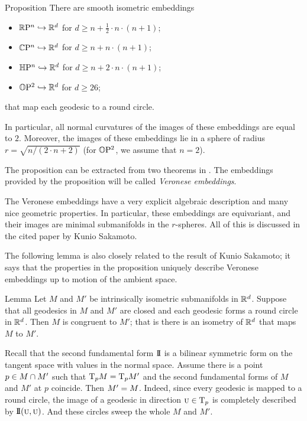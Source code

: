 \documentclass[a4paper,10pt]{article}
\begin{document}
\begin{thm}{Proposition}
There are smooth isometric embeddings
\begin{itemize}
 \item $\mathbb{R}\mathrm{P}^n \hookrightarrow\mathbb{R}^d$ for $d\ge n+\tfrac12\cdot n\cdot(n+1)$;
 \item $\mathbb{C}\mathrm{P}^n \hookrightarrow\mathbb{R}^d$ for $d\ge n+n\cdot(n+1)$;
 \item $\mathbb{H}\mathrm{P}^n \hookrightarrow\mathbb{R}^d$ for $d\ge n+2\cdot n\cdot(n+1)$;
 \item $\mathbb{O}\mathrm{P}^2 \hookrightarrow\mathbb{R}^d$ for $d\ge 26$;
\end{itemize}
that map each geodesic to a round circle.

In particular, all normal curvatures of the images of these embeddings are equal to $2$.
Moreover, the images of these embeddings lie in a sphere of radius $r=\sqrt{n/(2\cdot n+2)}$ (for $\mathbb{O}\mathrm{P}^2$, we assume that $n=2$). 
\end{thm}

The proposition can be extracted from two theorems in \cite[§ 2]{sakamoto}.
The embeddings provided by the proposition will be called \emph{Veronese embeddings}.

The Veronese embeddings have a very explicit algebraic description and many nice geometric properties.
In particular,
these embeddings are equivariant, and 
their images are minimal submanifolds in the $r$-spheres.
All of this is discussed in the cited paper by Kunio Sakamoto.

The following lemma is also closely related to the result of Kunio Sakamoto;
it says that the properties in the proposition uniquely describe
Veronese embeddings up to motion of the ambient space.

\begin{thm}{Lemma}
Let $M$ and $M'$ be intrinsically isometric submanifolds in $\mathbb{R}^d$.
Suppose that all geodesics in $M$ and $M'$ are closed
and each geodesic forms a round circle in $\mathbb{R}^d$.
Then $M$ is congruent to $M'$;
that is there is an isometry of $\mathbb{R}^d$ that maps $M$ to $M'$.
\end{thm}

Recall that the second fundamental form $\mathrm{I}\!\mathrm{I}$ is a bilinear symmetric form on the tangent space with values in the normal space.
Assume there is a point $p\z\in M\cap M'$ such that $\mathrm{T}_pM=\mathrm{T}_pM'$ and the second fundamental forms of $M$ and $M'$ at $p$ coincide.
Then $M'\z=M$.
Indeed, since every geodesic is mapped to a round circle, the image of a geodesic in direction ${{\normalfont\textsc{u}}}\in \mathrm{T}_p$ is completely described by $\mathrm{I}\!\mathrm{I}({{\normalfont\textsc{u}}},{{\normalfont\textsc{u}}})$.
And these circles sweep the whole $M$ and $M'$.
\end{document}
